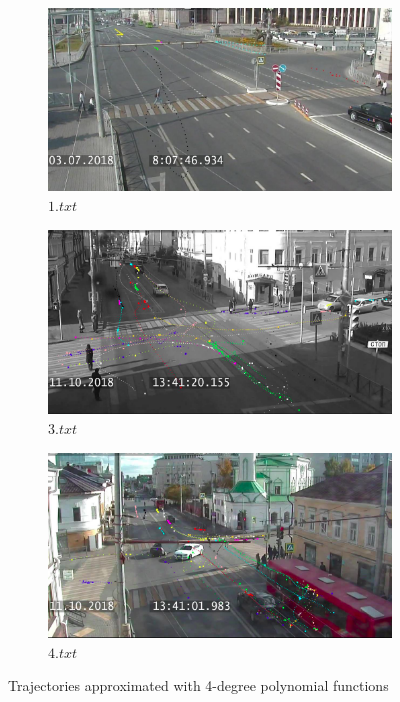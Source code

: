 \begin{figure}[!htb]
	\centering
	\begin{subfigure}[!htb]{0.3\textwidth}
		\centering{}
		\includegraphics[width=\textwidth]{images/regr_1_pol_4.jpg}
		\caption{$1.txt$}
		\label{fig:regr-1-pol-4}
	\end{subfigure}
	\hfill
	\begin{subfigure}[!htb]{0.3\textwidth}
		\centering{}
		\includegraphics[width=\textwidth]{images/regr_3_pol_4.png}
		\caption{$3.txt$}
		\label{fig:regr-3-pol-4}
	\end{subfigure}
	\hfill
	\begin{subfigure}[!htb]{0.3\textwidth}
		\centering{}
		\includegraphics[width=\textwidth]{images/regr_4_pol_4.png}
		\caption{$4.txt$}
		\label{fig:regr-4-pol-4}
	\end{subfigure}
	\caption{Trajectories approximated with 4-degree polynomial functions}
	\label{fig:regr-pol-4}
\end{figure}

